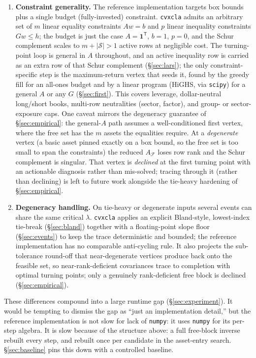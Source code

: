 \documentclass[11pt]{article}
\newcommand{\F}{\mathcal{F}}        %
\newcommand{\Sset}{\mathcal{S}}     %
\newcommand{\trans}{^{\mathsf{T}}}
\begin{document}
\begin{enumerate}
\item \textbf{Constraint generality.} The reference implementation targets box
bounds plus a single budget (fully-invested) constraint. \texttt{cvxcla} admits
an arbitrary set of $m$ linear equality constraints $A w = b$ and $p$ linear
inequality constraints $G w \le h$; the budget is just the case
$A = \mathbf{1}\trans$, $b = 1$, $p = 0$, and the Schur complement scales to
$m + |\Sset| > 1$ active rows at negligible cost. The turning-point loop is general
in $A$ throughout, and an active inequality row is carried as an extra row of that
Schur complement (\S\ref{sec:lars}); the only constraint-specific step is the
maximum-return vertex that seeds it, found by the greedy fill for an all-ones budget
and by a linear program (HiGHS, via \texttt{scipy}) for a general $A$ or any $G$
(\S\ref{sec:first}). This covers leverage, dollar-neutral long/short books, multi-row
neutralities (sector, factor), and group- or sector-exposure caps. One
caveat mirrors the degeneracy guarantee of \S\ref{sec:empirical}: the general-$A$
path assumes a well-conditioned first vertex, where the free set has the $m$ assets
the equalities require. At a \emph{degenerate} vertex (a basic asset pinned exactly
on a box bound, so the free set is too small to span the constraints) the reduced
$A_\F$ loses row rank and the Schur complement is singular. That vertex is
\emph{declined} at the first turning point with an actionable diagnosis rather than
mis-solved; tracing through it (rather than declining) is left to future work
alongside the tie-heavy hardening of \S\ref{sec:empirical}.

\item \textbf{Degeneracy handling.} On tie-heavy or degenerate inputs several
events can share the same critical $\lambda$. \texttt{cvxcla} applies an explicit
Bland-style, lowest-index tie-break (\S\ref{sec:bland}) together with a
floating-point slope floor (\S\ref{sec:events}) to keep the trace deterministic
and bounded; the reference implementation has no comparable anti-cycling rule. It
also projects the sub-tolerance round-off that near-degenerate vertices produce
back onto the feasible set, so near-rank-deficient covariances trace to
completion with optimal turning points; only a genuinely rank-deficient free
block is declined (\S\ref{sec:empirical}).
\end{enumerate}

These differences compound into a large runtime gap (\S\ref{sec:experiment}). It
would be tempting to dismiss the gap as ``just an implementation detail,'' but the
reference implementation is not slow for lack of \texttt{numpy}: it uses
\texttt{numpy} for its per-step algebra. It is slow because of the structure
above: a full free-block inverse rebuilt every step, and rebuilt once per
candidate in the asset-entry search. \S\ref{sec:baseline} pins this down with a
controlled baseline.
\end{document}
